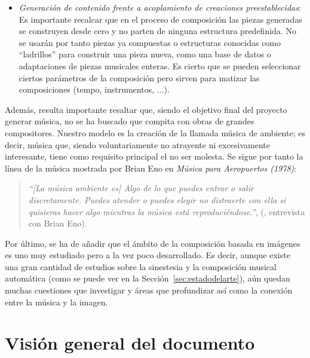 \begin{itemize}
		\item \emph{Generación de contenido frente a acoplamiento de creaciones preestablecidas}:
			\vspace{0.1in}
			\\Es importante recalcar que en el proceso de composición las piezas generadas se construyen desde cero y no parten de ninguna estructura predefinida. No se usarán por tanto piezas ya compuestas o estructuras conocidas como ``ladrillos'' para construir una pieza nueva, como una base de datos o adaptaciones de piezas musicales enteras. Es cierto que se pueden seleccionar ciertos parámetros de la composición pero sirven para matizar las composiciones (tempo, instrumentos, ...).
		\end{itemize}
		
		Además, resulta importante resaltar que, siendo el objetivo final del proyecto generar música, no se ha buscado que compita con obras de grandes compositores. Nuestro modelo es la creación de la llamada música de ambiente; es decir, música que, siendo voluntariamente no atrayente ni excesivamente interesante, tiene como requisito principal el no ser molesta. Se sigue por tanto la línea de la música mostrada por Brian Eno en \emph{Música para Aeropuertos (1978)}:
		
		\begin{quote}
		\emph{``[La música ambiente es] Algo de lo que puedes entrar o salir discretamente. Puedes atender o puedes elegir no distraerte con ella si quisieras hacer algo mientras la música está reproduciéndose.''}, (\cite{BrianEnoInterview}, entrevista con Brian Eno).
		\end{quote}		
		
		Por último, se ha de añadir que el ámbito de la composición basada en imágenes es uno muy estudiado pero a la vez poco desarrollado. Es decir, aunque existe una gran cantidad de estudios sobre la sinestesia y la composición musical automática (como se puede ver en la Sección~\ref{sec:estadodelarte}), aún quedan muchas cuestiones que investigar y áreas que profundizar así como la conexión entre la música y la imagen.\\




\section{Visión general del documento}

